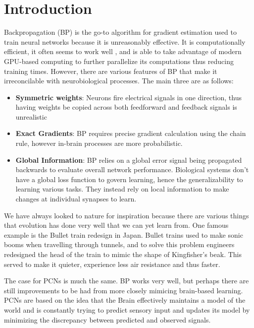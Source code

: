 \documentclass{article}
\theoremstyle{plain}
\theoremstyle{definition}
\theoremstyle{remark}
\begin{document}
\section{Introduction}

Backpropagation (BP) is the go-to algorithm for gradient estimation 
used to train neural networks because it is unreasonably effective.
It is computationally efficient, it often seems to work well 
\cite{LeCuBottOrrMull9812}, and is able to take advantage of modern 
GPU-based computing to further parallelize its computations thus 
reducing training times. However, there are various features of 
BP that make it irreconcilable with neurobiological processes. The main
three are as follows:

\begin{itemize}
    \item \textbf{Symmetric weights}: Neurons fire electrical signals in one
            direction, thus having weights be copied across both 
            feedforward and feedback signals is unrealistic
    \item \textbf{Exact Gradients}: BP requires precise gradient calculation
            using the chain rule, however in-brain processes are more probabilistic.
    \item \textbf{Global Information}: BP relies on a global error signal
            being propagated backwards to evaluate overall network performance.
            Biological systems don't have a global loss function to govern learning,
            hence the generalizability to learning various tasks. They instead rely 
            on local information to make changes at individual synapses to learn.
\end{itemize}

We have always looked to nature for inspiration because there are various things
that evolution has done very well that we can yet learn from. One famous
example is the Bullet train redesign in Japan. Bullet trains used to make
sonic booms when travelling through tunnels, and to solve this problem 
engineers redesigned the head of the train to mimic the shape of Kingfisher's
beak. This served to make it quieter, experience less air resistance and thus faster.

The case for PCNs is much the same. BP works very well, but perhaps there are 
still improvements to be had from more closely mimicing brain-based learning. 
PCNs are based on the idea that the Brain effectively maintains a model of 
the world and is constantly trying to predict sensory input and updates its model
by minimizing the discrepancy between predicted and observed signals. 
\end{document}

